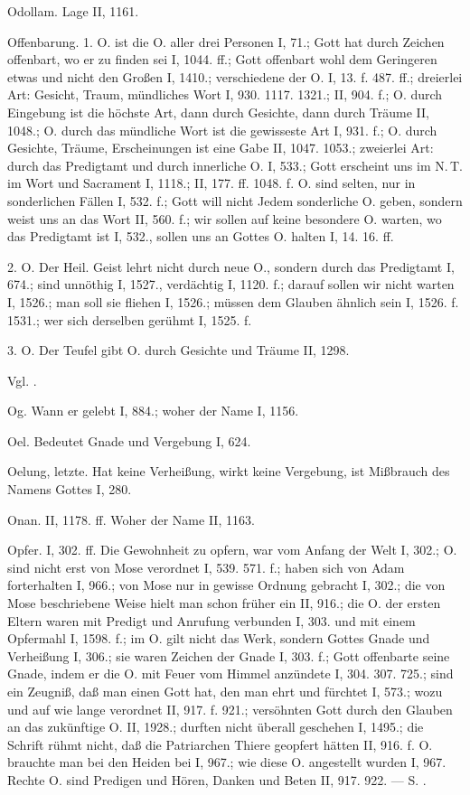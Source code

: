 Odollam. Lage II, 1161.

Offenbarung. 1.  O.  ist die O. aller drei Personen I, 71.; Gott hat  durch Zeichen offenbart, wo er zu finden sei I, 1044. ff.; Gott offenbart wohl dem Geringeren etwas und nicht den Großen I, 1410.; verschiedene  der O. I, 13. f. 487. ff.; dreierlei Art: Gesicht, Traum, mündliches Wort I, 930. 1117. 1321.; II, 904. f.; O. durch Eingebung ist die höchste Art, dann durch Gesichte, dann durch Träume II, 1048.; O. durch das mündliche Wort ist die gewisseste Art I, 931. f.; O. durch Gesichte, Träume, Erscheinungen ist eine Gabe II, 1047. 1053.; zweierlei Art: durch das Predigtamt und durch innerliche O. I, 533.; Gott erscheint uns im N.\,T. im Wort und Sacrament I, 1118.; II, 177. ff. 1048. f.  O. sind selten, nur in sonderlichen Fällen I, 532. f.; Gott will nicht Jedem sonderliche O. geben, sondern weist uns an das Wort II, 560. f.; wir sollen auf keine besondere O. warten, wo das Predigtamt ist I, 532., sollen uns an Gottes O. halten I, 14. 16. ff.

2.  O. Der Heil. Geist lehrt nicht durch neue O., sondern durch das Predigtamt I, 674.; sind unnöthig I, 1527., verdächtig I, 1120. f.; darauf sollen wir nicht warten I, 1526.; man soll sie fliehen I, 1526.; müssen dem Glauben ähnlich sein I, 1526. f. 1531.; wer sich derselben gerühmt I, 1525. f.

3. O.  Der Teufel gibt O. durch Gesichte und Träume II, 1298.

Vgl. .

Og. Wann er gelebt I, 884.; woher der Name I, 1156.

Oel. Bedeutet Gnade und Vergebung I, 624.

Oelung, letzte. Hat keine Verheißung, wirkt keine Vergebung, ist Mißbrauch des Namens Gottes I, 280.

Onan. II, 1178. ff. Woher der Name II, 1163.

Opfer. I, 302. ff. Die Gewohnheit zu opfern, war vom Anfang der Welt I, 302.; O. sind nicht erst von Mose verordnet I, 539. 571. f.; haben sich von Adam forterhalten I, 966.; von Mose nur in gewisse Ordnung gebracht I, 302.; die von Mose beschriebene Weise hielt man schon früher ein II, 916.; die O. der ersten Eltern waren mit Predigt und Anrufung verbunden I, 303. und mit einem Opfermahl I, 1598. f.; im O. gilt nicht das Werk, sondern Gottes Gnade und Verheißung I, 306.; sie waren Zeichen der Gnade I, 303. f.; Gott offenbarte seine Gnade, indem er die O. mit Feuer vom Himmel anzündete I, 304. 307. 725.; sind ein Zeugniß, daß man einen Gott hat, den man ehrt und fürchtet I, 573.; wozu und auf wie lange verordnet II, 917. f. 921.; versöhnten Gott durch den Glauben an das zukünftige O. II, 1928.; durften nicht überall geschehen I, 1495.; die Schrift rühmt nicht, daß die Patriarchen Thiere geopfert hätten II, 916. f. O. brauchte man bei den Heiden bei  I, 967.; wie diese O. angestellt wurden I, 967. Rechte O. sind Predigen und Hören, Danken und Beten II, 917. 922. — S. .

